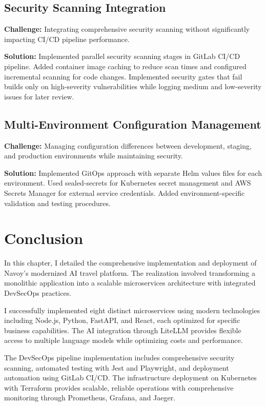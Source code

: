 \subsection{Security Scanning Integration}
\textbf{Challenge:} Integrating comprehensive security scanning without significantly impacting CI/CD pipeline performance.

\textbf{Solution:} Implemented parallel security scanning stages in GitLab CI/CD pipeline. Added container image caching to reduce scan times and configured incremental scanning for code changes. Implemented security gates that fail builds only on high-severity vulnerabilities while logging medium and low-severity issues for later review.

\subsection{Multi-Environment Configuration Management}
\textbf{Challenge:} Managing configuration differences between development, staging, and production environments while maintaining security.

\textbf{Solution:} Implemented GitOps approach with separate Helm values files for each environment. Used sealed-secrets for Kubernetes secret management and AWS Secrets Manager for external service credentials. Added environment-specific validation and testing procedures.

\setcounter{secnumdepth}{0} %
\section{Conclusion}
In this chapter, I detailed the comprehensive implementation and deployment of Navoy's modernized AI travel platform. The realization involved transforming a monolithic application into a scalable microservices architecture with integrated DevSecOps practices.

I successfully implemented eight distinct microservices using modern technologies including Node.js, Python, FastAPI, and React, each optimized for specific business capabilities. The AI integration through LiteLLM provides flexible access to multiple language models while optimizing costs and performance.

The DevSecOps pipeline implementation includes comprehensive security scanning, automated testing with Jest and Playwright, and deployment automation using GitLab CI/CD. The infrastructure deployment on Kubernetes with Terraform provides scalable, reliable operations with comprehensive monitoring through Prometheus, Grafana, and Jaeger.

